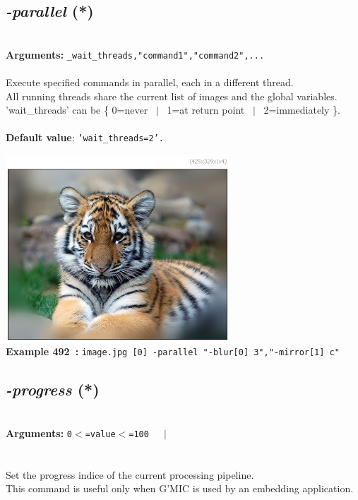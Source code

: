 \documentclass[a4paper,11pt,twoside]{book}
\begin{document}
\subsection{\emph{-parallel} (*)}\vspace*{-0.5em}
~\\\textbf{Arguments: } 
{\small \texttt{\_wait\_threads,"command1","command2",...}}\\~\\
Execute specified commands in parallel, each in a different thread.
~\\All running threads share the current list of images and the global variables.
~\\'wait\_threads' can be \{ 0=never ~$|$~ 1=at return point ~$|$~ 2=immediately \}.
~\\~\\\textbf{Default value}: {\small \texttt{'wait\_threads=2'.}}
\begin{center}\includegraphics[keepaspectratio=true,height=7cm,width=\textwidth]{img/gmic_def492.jpg}\\
{\footnotesize \textbf{Example 492~:} \texttt{image.jpg [0] -parallel "-blur[0] 3","-mirror[1] c"}}
\end{center}

\subsection{\emph{-progress} (*)}\vspace*{-0.5em}
~\\\textbf{Arguments: } 
{\small \texttt{0$<$=value$<$=100}}~~~$|$\\
\\~\\
Set the progress indice of the current processing pipeline.
~\\This command is useful only when G'MIC is used by an embedding application.
\end{document}

